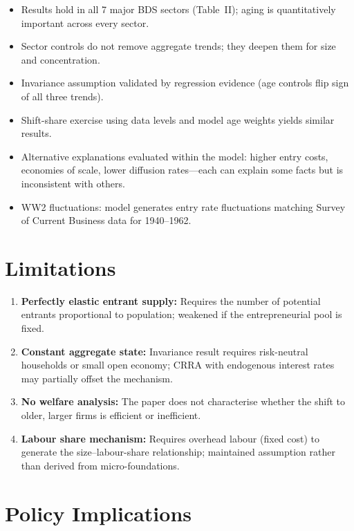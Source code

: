 \begin{itemize}
  \item Results hold in all 7 major BDS sectors (Table~II); aging is
    quantitatively important across every sector.
  \item Sector controls do not remove aggregate trends; they deepen them
    for size and concentration.
  \item Invariance assumption validated by regression evidence (age controls
    flip sign of all three trends).
  \item Shift-share exercise using data levels and model age weights yields
    similar results.
  \item Alternative explanations evaluated within the model: higher entry
    costs, economies of scale, lower diffusion rates---each can explain some
    facts but is inconsistent with others.
  \item WW2 fluctuations: model generates entry rate fluctuations matching
    Survey of Current Business data for 1940--1962.
\end{itemize}

\section{Limitations}

\begin{enumerate}
  \item \textbf{Perfectly elastic entrant supply:} Requires the number of
    potential entrants proportional to population; weakened if the
    entrepreneurial pool is fixed.
  \item \textbf{Constant aggregate state:} Invariance result requires
    risk-neutral households or small open economy; CRRA with endogenous
    interest rates may partially offset the mechanism.
  \item \textbf{No welfare analysis:} The paper does not characterise
    whether the shift to older, larger firms is efficient or inefficient.
  \item \textbf{Labour share mechanism:} Requires overhead labour (fixed
    cost) to generate the size--labour-share relationship; maintained
    assumption rather than derived from micro-foundations.
\end{enumerate}

\section{Policy Implications}

